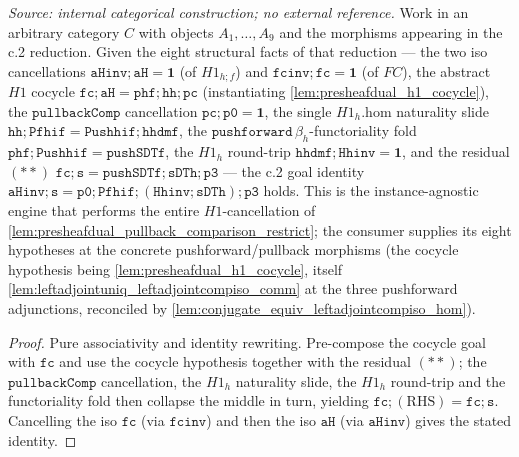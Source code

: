 \begin{lemma}
  \label{lem:c2_assemble}
  \textit{Source: internal categorical construction; no external reference.}
  Work in an arbitrary category \(C\) with objects \(A_1, \dots, A_9\) and the morphisms appearing in
  the c.2 reduction. Given the eight structural facts of that reduction --- the two iso cancellations
  \(\mathtt{aHinv} \mathbin{;} \mathtt{aH} = \mathbf{1}\) (of \(H1_{h \mathbin{;} f}\)) and
  \(\mathtt{fcinv} \mathbin{;} \mathtt{fc} = \mathbf{1}\) (of \(FC\)), the abstract \(H1\) cocycle
  \(\mathtt{fc} \mathbin{;} \mathtt{aH} = \mathtt{phf} \mathbin{;} \mathtt{hh} \mathbin{;} \mathtt{pc}\)
  (instantiating \cref{lem:presheafdual_h1_cocycle}), the \(\mathtt{pullbackComp}\) cancellation
  \(\mathtt{pc} \mathbin{;} \mathtt{p0} = \mathbf{1}\), the single \(H1_h.\mathrm{hom}\) naturality
  slide \(\mathtt{hh} \mathbin{;} \mathtt{Pfhif} = \mathtt{Pushhif} \mathbin{;} \mathtt{hhdmf}\), the
  \(\mathtt{pushforward}\,\beta_h\)-functoriality fold
  \(\mathtt{phf} \mathbin{;} \mathtt{Pushhif} = \mathtt{pushSDTf}\), the \(H1_h\) round-trip
  \(\mathtt{hhdmf} \mathbin{;} \mathtt{Hhinv} = \mathbf{1}\), and the residual \((**)\)
  \(\mathtt{fc} \mathbin{;} \mathtt{s} = \mathtt{pushSDTf} \mathbin{;} \mathtt{sDTh} \mathbin{;} \mathtt{p3}\)
  --- the c.2 goal identity
  \(\mathtt{aHinv} \mathbin{;} \mathtt{s}
    = \mathtt{p0} \mathbin{;} \mathtt{Pfhif} \mathbin{;} (\mathtt{Hhinv} \mathbin{;} \mathtt{sDTh}) \mathbin{;} \mathtt{p3}\)
  holds. This is the instance-agnostic engine that performs the entire \(H1\)-cancellation of
  \cref{lem:presheafdual_pullback_comparison_restrict}; the consumer supplies its eight hypotheses at
  the concrete pushforward/pullback morphisms (the cocycle hypothesis being
  \cref{lem:presheafdual_h1_cocycle}, itself \cref{lem:leftadjointuniq_leftadjointcompiso_comm} at the
  three pushforward adjunctions, reconciled by \cref{lem:conjugate_equiv_leftadjointcompiso_hom}).
\end{lemma}
\begin{proof}
  \leanok
  Pure associativity and identity rewriting. Pre-compose the cocycle goal with \(\mathtt{fc}\) and use
  the cocycle hypothesis together with the residual \((**)\); the \(\mathtt{pullbackComp}\)
  cancellation, the \(H1_h\) naturality slide, the \(H1_h\) round-trip and the functoriality fold then
  collapse the middle in turn, yielding \(\mathtt{fc} \mathbin{;} (\text{RHS}) = \mathtt{fc} \mathbin{;} \mathtt{s}\).
  Cancelling the iso \(\mathtt{fc}\) (via \(\mathtt{fcinv}\)) and then the iso \(\mathtt{aH}\) (via
  \(\mathtt{aHinv}\)) gives the stated identity.
\end{proof}

